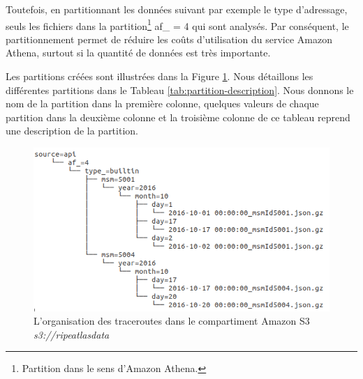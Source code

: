 Toutefois, en partitionnant les données suivant par exemple le type d'adressage, seuls les fichiers dans la partition\footnote{Partition dans le sens d'Amazon Athena.} af\_ = 4 qui sont analysés. Par conséquent, le partitionnement permet de réduire les coûts d'utilisation du service Amazon Athena, surtout si la quantité de données est très importante. 


Les partitions   créées sont illustrées  dans la Figure 	\ref{fig:partitionnement-athenaa}. Nous détaillons les différentes partitions dans le Tableau \ref{tab:partition-description}. Nous donnons le nom de la partition dans la première colonne, quelques valeurs de chaque partition dans la deuxième colonne et la troisième colonne de ce tableau reprend une description de la partition.

\begin{figure}[H]
	\centering
	\captionsetup{justification=centering}
	\includegraphics[width=1\linewidth]{illustrations/partitionnement-athena}
	\caption{L'organisation des traceroutes dans le compartiment Amazon S3 \textit{s3://ripeatlasdata}}
	\label{fig:partitionnement-athenaa}
\end{figure}

